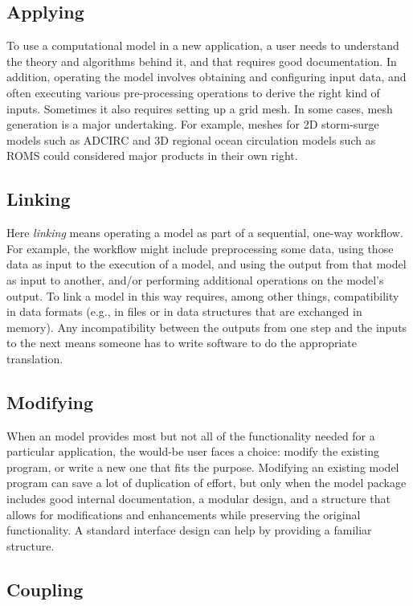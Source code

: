 \documentclass[12pt]{amsart}
\begin{document}
\subsection{Applying}

To use a computational model in a new application, a user needs to understand the theory and algorithms behind it, and that requires good documentation. In addition, operating the model involves obtaining and configuring input data, and often executing various pre-processing operations to derive the right kind of inputs. Sometimes it also requires setting up a grid mesh. In some cases, mesh generation is a major undertaking. For example, meshes for 2D storm-surge models such as ADCIRC and 3D regional ocean circulation models such as ROMS could considered major products in their own right.


\subsection{Linking}

Here \textit{linking} means operating a model as part of a sequential, one-way workflow. For example, the workflow might include preprocessing some data, using those data as input to the execution of a model, and using the output from that model as input to another, and/or performing additional operations on the model's output. To link a model in this way requires, among other things, compatibility in data formats (e.g., in files or in data structures that are exchanged in memory). Any incompatibility between the outputs from one step and the inputs to the next means someone has to write software to do the appropriate translation.

\subsection{Modifying}

When an model provides most but not all of the functionality needed for a particular application, the would-be user faces a choice: modify the existing program, or write a new one that fits the purpose. Modifying an existing model program can save a lot of duplication of effort, but only when the model package includes good internal documentation, a modular design, and a structure that allows for modifications and enhancements while preserving the original functionality. A standard interface design can help by providing a familiar structure.

\subsection{Coupling}
\end{document}
